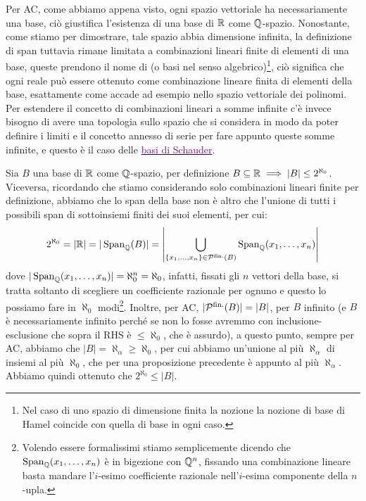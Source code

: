 \begin{remark}
	Per AC, come abbiamo appena visto, ogni spazio vettoriale ha necessariamente una base, ciò giustifica l'esistenza di una base di $\mathbb R$ come $\mathbb Q$-spazio. Nonostante, come stiamo per dimostrare, tale spazio abbia dimensione infinita, la definizione di span tuttavia rimane limitata a combinazioni lineari finite di elementi di una base,
	queste prendono il nome di  (o basi nel senso algebrico)\footnote{Nel caso di uno spazio di dimensione finita la nozione la nozione di base di Hamel coincide con quella di base in ogni caso.}, ciò significa 
	che ogni reale può essere ottenuto come combinazione lineare finita di elementi della base, esattamente come accade ad esempio nello spazio vettoriale dei polinomi.\\
	Per estendere il concetto di combinazioni lineari a somme infinite c'è invece bisogno di avere una topologia sullo spazio che si considera in modo da poter definire i limiti e il concetto annesso di serie per fare appunto queste somme infinite,
	e questo è il caso delle \href{https://en.wikipedia.org/wiki/Schauder_basis}{\textcolor{purple}{basi di Schauder}}.
\end{remark}

\begin{soln}
	Sia $B$ una base di $\mathbb R$ come $\mathbb Q$-spazio, per definizione $B \subseteq \mathbb R \implies |B|\leq 2^{\aleph_0}$. Viceversa, ricordando che stiamo considerando solo combinazioni lineari finite per definizione, abbiamo che lo span della base non è altro che l'unione di tutti i possibili span di sottoinsiemi finiti dei suoi elementi, per cui:
	\[  2^{\aleph_0} = |\mathbb R| = |\operatorname{Span}_\mathbb Q(B)| = \left\lvert \bigcup_{\{x_1,\ldots,x_n\} \in \mathcal{P}^{\text{fin.}}(B)} \operatorname{Span}_\mathbb Q(x_1,\ldots,x_n)\right\rvert
		\]
	dove $|\operatorname{Span}_\mathbb Q(x_1,\ldots,x_n)| = \aleph_0^n = \aleph_0$, infatti, fissati gli $n$ vettori della base, si tratta soltanto di scegliere un coefficiente razionale per ognuno e
	questo lo possiamo fare in $\aleph_0$ modi\footnote{Volendo essere formalissimi stiamo semplicemente dicendo che $\operatorname{Span}_\mathbb Q(x_1,\ldots,x_n)$ è in bigezione con $\mathbb Q^{n}$, fissando una combinazione lineare basta mandare l’$i$-esimo coefficiente razionale nell'$i$-esima componente della $n$-upla.}.
	Inoltre, per AC, $|\mathcal{P}^{\text{fin.}}(B)| = |B|$, per $B$ infinito (e $B$ è necessariamente infinito perché se non lo fosse avremmo con inclusione-esclusione che sopra il RHS è $\leq \aleph_0$, che è assurdo), a questo punto, sempre per AC, abbiamo che $|B| = \aleph_\alpha \geq \aleph_0$, per cui abbiamo un'unione al più $\aleph_\alpha$ di insiemi al più $\aleph_0$, che per una proposizione precedente è appunto al più $\aleph_\alpha$.
	Abbiamo quindi ottenuto che $2^{\aleph_0} \leq |B|$.
\end{soln}

